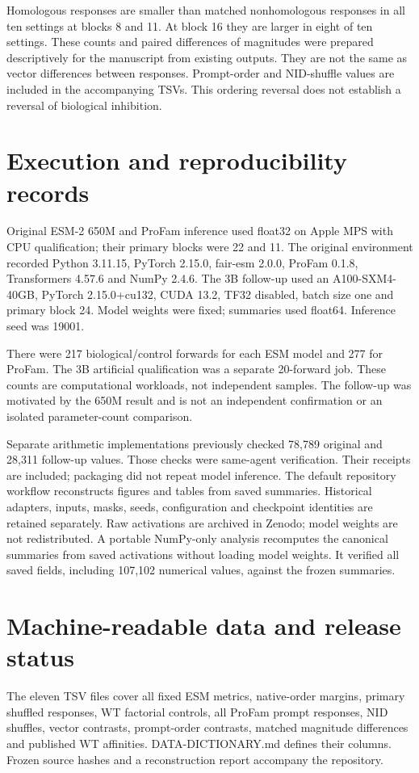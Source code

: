 \documentclass[a4paper,11pt]{scrartcl}
\begin{document}
\endgroup
Homologous responses are smaller than matched nonhomologous responses in all ten settings at blocks 8 and 11. At block 16 they are larger in eight of ten settings. These counts and paired differences of magnitudes were prepared descriptively for the manuscript from existing outputs. They are not the same as vector differences between responses. Prompt-order and NID-shuffle values are included in the accompanying TSVs. This ordering reversal does not establish a reversal of biological inhibition.
\section{Execution and reproducibility records}
Original ESM-2 650M and ProFam inference used float32 on Apple MPS with CPU qualification; their primary blocks were 22 and 11. The original environment recorded Python 3.11.15, PyTorch 2.15.0, fair-esm 2.0.0, ProFam 0.1.8, Transformers 4.57.6 and NumPy 2.4.6. The 3B follow-up used an A100-SXM4-40GB, PyTorch 2.15.0+cu132, CUDA 13.2, TF32 disabled, batch size one and primary block 24. Model weights were fixed; summaries used float64. Inference seed was 19001.

There were 217 biological/control forwards for each ESM model and 277 for ProFam. The 3B artificial qualification was a separate 20-forward job. These counts are computational workloads, not independent samples. The follow-up was motivated by the 650M result and is not an independent confirmation or an isolated parameter-count comparison.

Separate arithmetic implementations previously checked 78,789 original and 28,311 follow-up values. Those checks were same-agent verification. Their receipts are included; packaging did not repeat model inference. The default repository workflow reconstructs figures and tables from saved summaries. Historical adapters, inputs, masks, seeds, configuration and checkpoint identities are retained separately. Raw activations are archived in Zenodo; model weights are not redistributed. A portable NumPy-only analysis recomputes the canonical summaries from saved activations without loading model weights. It verified all saved fields, including 107,102 numerical values, against the frozen summaries.
\section{Machine-readable data and release status}
The eleven TSV files cover all fixed ESM metrics, native-order margins, primary shuffled responses, WT factorial controls, all ProFam prompt responses, NID shuffles, vector contrasts, prompt-order contrasts, matched magnitude differences and published WT affinities. \textnormal{DATA-DICTIONARY.md} defines their columns. Frozen source hashes and a reconstruction report accompany the repository.
\end{document}
